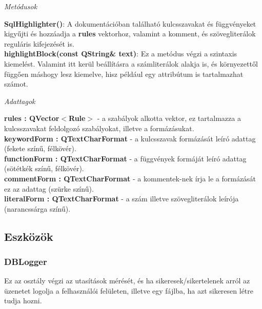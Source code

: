 \begin{flushleft}
\textit{Metódusok}
\end{flushleft}
\textbf{SqlHighlighter()}: A dokumentációban található kulcsszavakat és függvényeket kigyűjti és hozzáadja a \textbf{rules} vektorhoz, valamint a komment, és szövegliterálok reguláris kifejezését is. \\
\textbf{highlightBlock(const QString\& text)}: Ez a metódus végzi a szintaxis kiemelést. Valamint itt kerül beállításra a számliterálok alakja is, és környezettől függően máshogy lesz kiemelve, hisz például egy attribútum is tartalmazhat számot. \\
\begin{flushleft}
\textit{Adattagok}
\end{flushleft}
\textbf{rules : QVector$<$Rule$>$} - a szabályok alkotta vektor, ez tartalmazza a kulcsszavakat feldolgozó szabályokat, illetve a formázásukat. \\
\textbf{keywordForm : QTextCharFormat} - a kulcsszavak formázását leíró adattag (fekete színű, félkövér). \\
\textbf{functionForm : QTextCharFormat} - a függvények formáját leíró adattag (sötétkék színű, félkövér). \\
\textbf{commentForm : QTextCharFormat} - a kommentek-nek írja le a formázását ez az adattag (szürke színű). \\
\textbf{literalForm : QTextCharFormat} - a szám illetve szövegliterálok leírója (narancssárga színű).
\newpage
\subsection{Eszközök}
\subsubsection{DBLogger}

Ez az osztály végzi az utasítások mérését, és ha sikeresek/sikertelenek arról az üzenetet logolja a felhasználói felületen, illetve egy fájlba, ha azt sikeresen létre tudja hozni.

